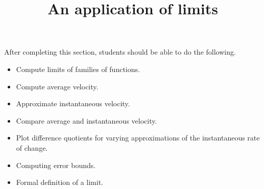\documentclass{ximera}
\title{An application of limits}
\begin{document}
\begin{abstract}
\end{abstract}

\maketitle

\begin{sectionOutcomes}

After completing this section, students should be able to do the following.

\begin{itemize}
\item Compute limits of families of functions. 
\item Compute average velocity.
\item Approximate instantaneous velocity.
\item Compare average and instantaneous velocity.
\item Plot difference quotients for varying approximations of the
  instantaneous rate of change.
\item Computing error bounds.
\item Formal definition of a limit.
\end{itemize}

\end{sectionOutcomes}
\end{document}
